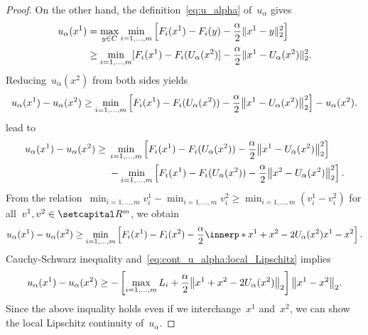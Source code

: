 \documentclass[../../main]{subfiles}
\begin{document}
\begin{proof}
    On the other hand, the definition~\cref{eq:u_alpha} of~$u_\alpha$ gives
    \begin{align}
        u_\alpha(x^1) &= \max_{y \in C} \min_{i = 1, \dots, m} \left[ F_i(x^1) - F_i(y) - \frac{\alpha}{2} \lVert x^1 - y\rVert_2^2 \right] \\
                      &\ge \min_{i = 1, \dots, m} [F_i(x^1) - F_i(U_\alpha(x^2)] - \frac{\alpha}{2} \lVert x^1 - U_\alpha(x^2)\rVert_2^2
    .\end{align}
    Reducing~$u_\alpha(x^2)$ from both sides yields
    \[
        u_\alpha(x^1) - u_\alpha(x^2) \ge \min_{i = 1, \dots, m} \left[F_i(x^1) - F_i(U_\alpha(x^2)) - \frac{\alpha}{2} \norm*{x^1 - U_\alpha(x^2)}_2^2\right] - u_\alpha(x^2)
    .\] 
     lead to
    \begin{align}
        u_\alpha(x^1) - u_\alpha(x^2) \ge{}& \min_{i = 1, \dots, m} \left[F_i(x^1) - F_i(U_\alpha(x^2)) - \frac{\alpha}{2} \norm*{x^1 - U_\alpha(x^2)}_2^2\right] \\
    &- \min_{i = 1, \dots, m} \left[F_i(x^1) - F_i(U_\alpha(x^2)) - \frac{\alpha}{2} \norm*{x^2 - U_\alpha(x^2)}_2^2 \right]
    .\end{align}
    From the relation~$\min_{i = 1, \dots, m} v^1_i - \min_{i = 1, \dots, m} v^2_i \ge \min_{i = 1, \dots, m} (v^1_i - v^2_i)$ for all~$v^1, v^2 \in \setR^m$, we obtain
    \[
        u_\alpha(x^1) - u_\alpha(x^2) \ge \min_{i = 1, \dots, m} \left[ F_i(x^1) - F_i(x^2) - \frac{\alpha}{2} \innerp*{x^1 + x^2 - 2 U_\alpha(x^2)}{x^1 - x^2} \right] 
    .\] 
    Cauchy-Schwarz inequality and~\cref{eq:cont_u_alpha:local_Lipschitz} implies
    \[
        u_\alpha(x^1) - u_\alpha(x^2) \ge - \left[ \max_{i = 1, \dots, m} L_i + \frac{\alpha}{2} \norm*{x^1 + x^2 - 2 U_\alpha(x^2)}_2\right] \norm*{x^1 - x^2}_2
    .\] 
    Since the above inquality holds even if we interchange~$x^1$ and~$x^2$, we can show the local Lipschitz continuity of~$u_\alpha$.
\end{proof}
\end{document}
